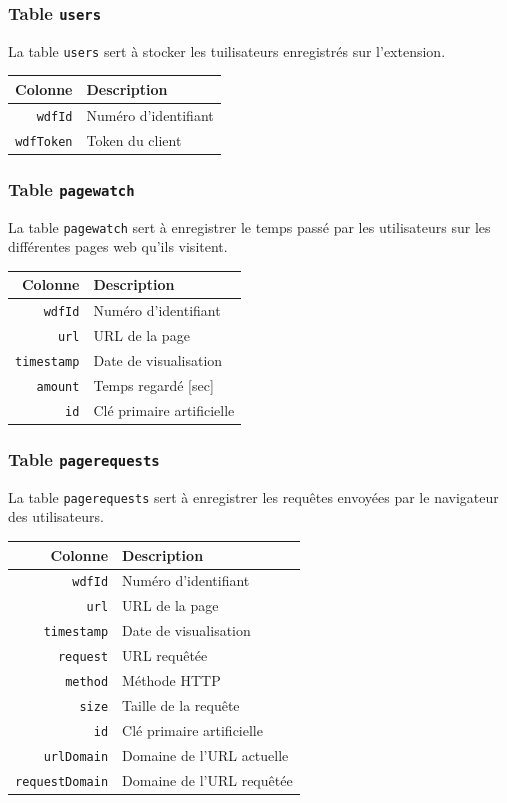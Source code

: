 		\subsubsection{Table \texttt{users}}\label{table-users}
			La table \texttt{users} sert à stocker les tuilisateurs enregistrés sur l'extension.

			\begin{tabular}{rl}
				\textbf{Colonne} & \textbf{Description} \\
				\hline
			    \texttt{wdfId}    & Numéro d'identifiant \\
				\texttt{wdfToken} & Token du client \\
			\end{tabular}
		
		\subsubsection{Table \texttt{pagewatch}}\label{table-pagewatch}
			La table \texttt{pagewatch} sert à enregistrer le temps passé par les utilisateurs sur les différentes pages web qu'ils visitent.

			\begin{tabular}{rl}
				\textbf{Colonne} & \textbf{Description} \\
				\hline
			    \texttt{wdfId}    & Numéro d'identifiant \\
				\texttt{url}  & URL de la page \\
				\texttt{timestamp} & Date de visualisation \\
				\texttt{amount} & Temps regardé [sec] \\
				\texttt{id} & Clé primaire artificielle \\
			\end{tabular}
		
		\subsubsection{Table \texttt{pagerequests}}\label{table-pagerequests}
			La table \texttt{pagerequests} sert à enregistrer les requêtes envoyées par le navigateur des utilisateurs.

			\begin{tabular}{rl}
				\textbf{Colonne} & \textbf{Description} \\
				\hline
			    \texttt{wdfId}    & Numéro d'identifiant \\
				\texttt{url}  & URL de la page \\
				\texttt{timestamp} & Date de visualisation \\
				\texttt{request} & URL requêtée \\
				\texttt{method} & Méthode HTTP \\
				\texttt{size} & Taille de la requête \\
				\texttt{id} & Clé primaire artificielle \\
				\texttt{urlDomain} & Domaine de l'URL actuelle \\
				\texttt{requestDomain} & Domaine de l'URL requêtée\\
			\end{tabular}
		

